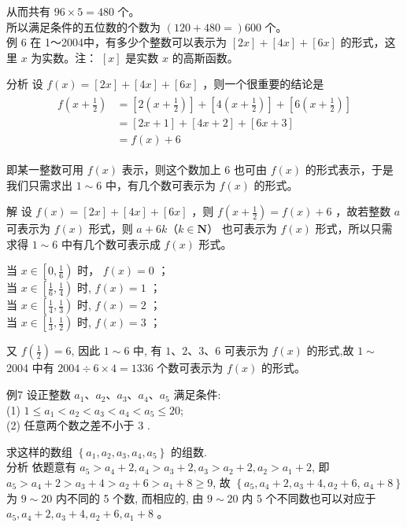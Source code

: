 \documentclass[10pt]{article}
\begin{document}
从而共有 $96 \times 5=480$ 个。\\
所以满足条件的五位数的个数为 $(120+480=) 600$ 个。\\
例 6 在 1～2004中，有多少个整数可以表示为 $[2 x]+[4 x]+[6 x]$ 的形式，这里 $x$ 为实数。注： $[x]$ 是实数 $x$ 的高斯函数。

分析 设 $f(x)=[2 x]+[4 x]+[6 x]$ ，则一个很重要的结论是\\
\begin{align*}
\begin{aligned}
f\left(x+\frac{1}{2}\right) & =\left[2\left(x+\frac{1}{2}\right)\right]+\left[4\left(x+\frac{1}{2}\right)\right]+\left[6\left(x+\frac{1}{2}\right)\right] \\
& =[2 x+1]+[4 x+2]+[6 x+3] \\
& =f(x)+6
\end{aligned}
\end{align*}

即某一整数可用 $f(x)$ 表示，则这个数加上 6 也可由 $f(x)$ 的形式表示，于是我们只需求出 $1 \sim 6$ 中，有几个数可表示为 $f(x)$ 的形式。

解 设 $f(x)=[2 x]+[4 x]+[6 x]$ ，则 $f\left(x+\frac{1}{2}\right)=f(x)+6$ ，故若整数 $a$ 可表示为 $f(x)$ 形式，则 $a+6 k （ k \in \mathbf{N} ）$ 也可表示为 $f(x)$ 形式，所以只需求得 $1 \sim 6$ 中有几个数可表示成 $f(x)$ 形式。

当 $x \in\left[0, \frac{1}{6}\right)$ 时， $f(x)=0$ ；\\
当 $x \in\left[\frac{1}{6}, \frac{1}{4}\right)$ 时, $f(x)=1$ ；\\
当 $x \in\left[\frac{1}{4}, \frac{1}{3}\right)$ 时, $f(x)=2$ ；\\
当 $x \in\left[\frac{1}{3}, \frac{1}{2}\right)$ 时, $f(x)=3$ ；

又 $f\left(\frac{1}{2}\right)=6$, 因此 $1 \sim 6$ 中, 有 $1 、 2 、 3 、 6$ 可表示为 $f(x)$ 的形式,故 $1 \sim$ 2004 中有 $2004 \div 6 \times 4=1336$ 个数可表示为 $f(x)$ 的形式。

例7 设正整数 $a_{1} 、 a_{2} 、 a_{3} 、 a_{4} 、 a_{5}$ 满足条件:\\
(1) $1 \leqslant a_{1}<a_{2}<a_{3}<a_{4}<a_{5} \leqslant 20$;\\
(2) 任意两个数之差不小于 3 .

求这样的数组 $\left\{a_{1}, a_{2}, a_{3}, a_{4}, a_{5}\right\}$ 的组数.\\
分析 依题意有 $a_{5}>a_{4}+2, a_{4}>a_{3}+2, a_{3}>a_{2}+2, a_{2}>a_{1}+2$, 即 $a_{5}>a_{4}+2>a_{3}+4>a_{2}+6>a_{1}+8 \geqslant 9$, 故 $\left\{a_{5}, a_{4}+2, a_{3}+4, a_{2}+6\right.$, $\left.a_{4}+8\right\}$ 为 $9 \sim 20$ 内不同的 5 个数, 而相应的, 由 $9 \sim 20$ 内 5 个不同数也可以对应于 $a_{5}, a_{4}+2, a_{3}+4, a_{2}+6, a_{1}+8$ 。
\end{document}
